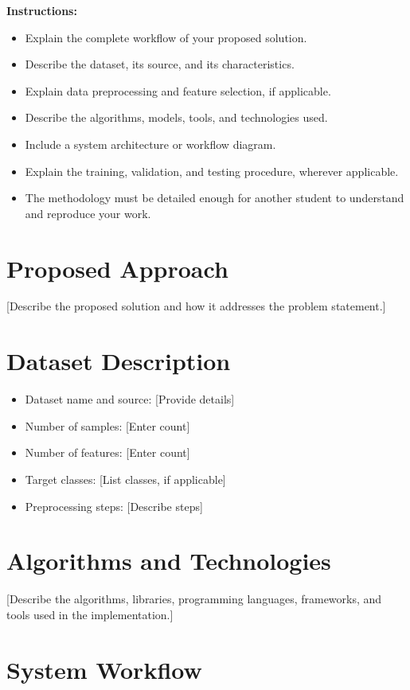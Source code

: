 \documentclass[12pt,a4paper]{report}
\begin{document}
\textbf{Instructions:}
\begin{itemize}
    \item Explain the complete workflow of your proposed solution.
    \item Describe the dataset, its source, and its characteristics.
    \item Explain data preprocessing and feature selection, if applicable.
    \item Describe the algorithms, models, tools, and technologies used.
    \item Include a system architecture or workflow diagram.
    \item Explain the training, validation, and testing procedure,
    wherever applicable.
    \item The methodology must be detailed enough for another
    student to understand and reproduce your work.
\end{itemize}

\section{Proposed Approach}

[Describe the proposed solution and how it addresses
the problem statement.]

\section{Dataset Description}

\begin{itemize}
    \item Dataset name and source: [Provide details]
    \item Number of samples: [Enter count]
    \item Number of features: [Enter count]
    \item Target classes: [List classes, if applicable]
    \item Preprocessing steps: [Describe steps]
\end{itemize}

\section{Algorithms and Technologies}

[Describe the algorithms, libraries, programming languages,
frameworks, and tools used in the implementation.]

\section{System Workflow}
\end{document}
